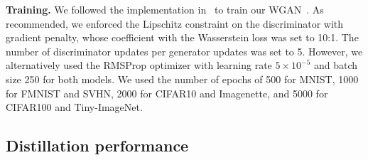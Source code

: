 \documentclass[12pt, a4paper, twoside]{book}
\numberwithin{equation}{chapter}
\theoremstyle{plain}
\theoremstyle{definition}
\theoremstyle{remark}
\newenvironment{foldable}{}{}
\begin{document}
\begin{foldable}
  \textbf{Training.} We followed the implementation in~\cite{gulrajani2017improved} to train our WGAN~\cite{arjovsky2017wasserstein}.
  As recommended, we enforced the Lipschitz constraint on the discriminator with gradient penalty, whose coefficient with the Wasserstein loss was set to 10:1.
  The number of discriminator updates per generator updates was set to 5.
  However, we alternatively used the RMSProp optimizer with learning rate $5 \times 10^{-5}$ and batch size 250 for both models.
  We used the number of epochs of 500 for MNIST, 1000 for FMNIST and SVHN, 2000 for CIFAR10 and Imagenette, and 5000 for CIFAR100 and Tiny-ImageNet.
\end{foldable}

\subsection{Distillation performance}
\end{document}
